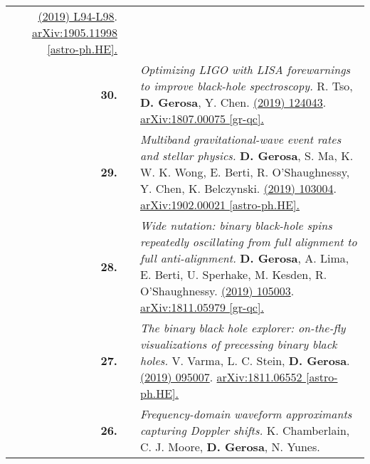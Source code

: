 {\begin{longtable}{rp{0.3cm}p{15.8cm}}
\href{https://doi.org/10.1093/mnrasl/slz104}{\mnrasl 488 (2019) L94-L98}. \href{https://arxiv.org/abs/1905.11998}{arXiv:1905.11998 [astro-ph.HE].}
\vspace{0.09cm}\\
%
\textbf{30.} & & \textit{Optimizing LIGO with LISA forewarnings to improve black-hole spectroscopy.}
\newline{}
R. Tso, \textbf{D. Gerosa}, Y. Chen.
\newline{}
\href{https://journals.aps.org/prd/abstract/10.1103/PhysRevD.99.124043}{\prd 99 (2019) 124043}. \href{https://arxiv.org/abs/1807.00075}{arXiv:1807.00075 [gr-qc].}
\vspace{0.09cm}\\
%
\textbf{29.} & & \textit{Multiband gravitational-wave event rates and stellar physics.}
\newline{}
\textbf{D. Gerosa}, S. Ma, K. W. K. Wong, E. Berti, R. O'Shaughnessy, Y. Chen, K. Belczynski.
\newline{}
\href{https://journals.aps.org/prd/abstract/10.1103/PhysRevD.99.103004}{\prd 99 (2019) 103004}. \href{https://arxiv.org/abs/1902.00021}{arXiv:1902.00021 [astro-ph.HE].}
\vspace{0.09cm}\\
%
\textbf{28.} & & \textit{Wide nutation: binary black-hole spins repeatedly oscillating from full alignment to full anti-alignment.}
\newline{}
\textbf{D. Gerosa}, A. Lima, E. Berti, U. Sperhake, M. Kesden, R. O'Shaughnessy.
\newline{}
\href{https://iopscience.iop.org/article/10.1088/1361-6382/ab14ae/meta}{\cqg 36 (2019) 105003}. \href{https://arxiv.org/abs/1811.05979}{arXiv:1811.05979 [gr-qc].}
\vspace{0.09cm}\\
%
\textbf{27.} & & \textit{The binary black hole explorer: on-the-fly visualizations of precessing binary black holes.}
\newline{}
V. Varma, L. C. Stein, \textbf{D. Gerosa}.
\newline{}
\href{https://iopscience.iop.org/article/10.1088/1361-6382/ab0ee9/meta}{\cqg 36 (2019) 095007}. \href{https://arxiv.org/abs/1811.06552}{arXiv:1811.06552 [astro-ph.HE].}
\vspace{0.09cm}\\
%
\textbf{26.} & & \textit{Frequency-domain waveform approximants capturing Doppler shifts.}
\newline{}
K. Chamberlain, C. J. Moore, \textbf{D. Gerosa}, N. Yunes.

\end{longtable}}
